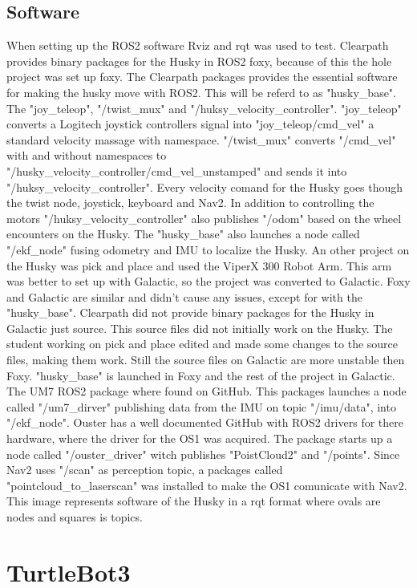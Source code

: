 \subsection{Software}
When setting up the ROS2 software Rviz and rqt was used to test.
Clearpath provides binary packages for the Husky in ROS2 foxy, because of this the hole project was set up foxy. The Clearpath packages provides the essential software for making the husky move with ROS2. This will be referd to as "husky\_base". The "joy\_teleop", "/twist\_mux" and "/huksy\_velocity\_controller". 
"joy\_teleop" converts a Logitech joystick controllers signal into "joy\_teleop/cmd\_vel" a standard velocity massage with namespace. "/twist\_mux" converts "/cmd\_vel" with and without namespaces to "/husky\_velocity\_controller/cmd\_vel\_unstamped" and sends it into "/huksy\_velocity\_controller". Every velocity comand for the Husky goes though the twist node, joystick, keyboard and Nav2. In addition to controlling the motors "/huksy\_velocity\_controller" also publishes "/odom" based on the wheel encounters on the Husky. The "husky\_base" also launches a node called "/ekf\_node" fusing odometry and IMU to localize the Husky. 
An other project on the Husky was pick and place and used the ViperX 300 Robot Arm. This arm was better to set up with Galactic, so the project was converted to Galactic. Foxy and Galactic are similar and didn't cause any issues, except for with the "husky\_base". Clearpath did not provide binary packages for the Husky in Galactic just source. This source files did not initially work on the Husky. The student working on pick and place edited and made some changes to the source files, making them work. Still the source files on Galactic are more unstable then Foxy. "husky\_base" is launched in Foxy and the rest of the project in Galactic. 
The UM7 ROS2 package where found on GitHub. This packages launches a node called "/um7\_dirver" publishing data from the IMU on topic "/imu/data", into "/ekf\_node".
Ouster has a well documented GitHub with ROS2 drivers for there hardware, where the driver for the OS1 was acquired. The package starts up a node called "/ouster\_driver" witch publishes "PoistCloud2" and "/points". Since Nav2 uses "/scan" as perception topic, a packages called "pointcloud\_to\_laserscan" was installed to make the OS1 comunicate with Nav2. 
This image represents software of the Husky in a rqt format where ovals are nodes and squares is topics. 


\section{TurtleBot3}
